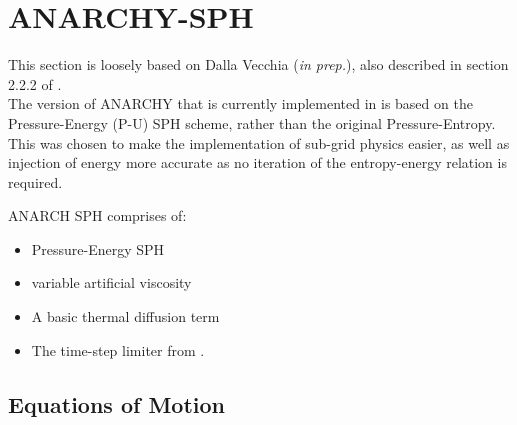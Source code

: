 \section{ANARCHY-SPH}
\label{sec:sph:anarchy}

This section is loosely based on Dalla Vecchia (\textit{in prep.}), also described in section 2.2.2 of
\cite{Schaller2015}.\\

The version of ANARCHY that is currently implemented in \swift{} is based on the Pressure-Energy
(P-U) SPH scheme, rather than the original Pressure-Entropy. This was chosen to make the
implementation of sub-grid physics easier, as well as injection of energy more accurate as
no iteration of the entropy-energy relation is required.

ANARCH SPH comprises of:
\begin{itemize}
	\item Pressure-Energy SPH
	\item \citet[][, henceforth C\&D]{cullen2010} variable artificial viscosity
	\item A basic thermal diffusion term
	\item The time-step limiter from \citet{durier2012}.
\end{itemize}

\subsection{Equations of Motion}

